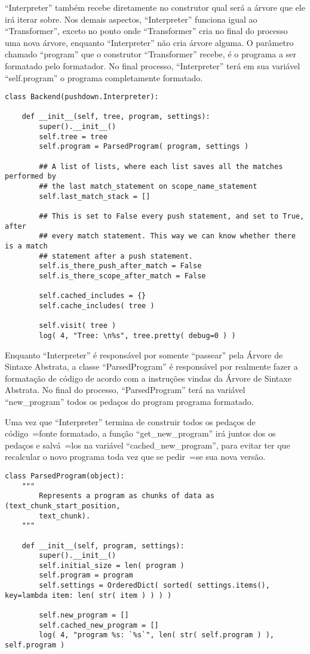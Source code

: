 ``Interpreter'' também recebe diretamente no construtor qual será a árvore que ele irá iterar sobre.
Nos demais aspectos,
``Interpreter'' funciona igual ao ``Transformer'',
exceto no ponto onde ``Transformer'' cria no final do processo uma nova árvore,
enquanto ``Interpreter'' não cria árvore alguma.
O parâmetro chamado ``program'' que o construtor ``Transformer'' recebe,
é o programa a ser formatado pelo formatador.
No final processo,
``Interpreter'' terá em sua variável ``self.program'' o programa completamente formatado.
\begin{lstlisting}[caption={Construtor do Formatador},label={construtorDoFormatador},style=mypython]
class Backend(pushdown.Interpreter):

    def __init__(self, tree, program, settings):
        super().__init__()
        self.tree = tree
        self.program = ParsedProgram( program, settings )

        ## A list of lists, where each list saves all the matches performed by
        ## the last match_statement on scope_name_statement
        self.last_match_stack = []

        ## This is set to False every push statement, and set to True, after
        ## every match statement. This way we can know whether there is a match
        ## statement after a push statement.
        self.is_there_push_after_match = False
        self.is_there_scope_after_match = False

        self.cached_includes = {}
        self.cache_includes( tree )

        self.visit( tree )
        log( 4, "Tree: \n%s", tree.pretty( debug=0 ) )
\end{lstlisting}

Enquanto ``Interpreter'' é responsável por somente ``passear'' pela Árvore de Sintaxe Abstrata,
a classe ``ParsedProgram''  é responsável por realmente fazer a formatação de código de acordo com a instruções vindas da Árvore de Sintaxe Abstrata.
No final do processo,
``ParsedProgram'' terá na variável ``new\_program'' todos os pedaços do program programa formatado.

Uma vez que ``Interpreter'' termina de construir todos os pedaços de código~=fonte formatado,
a função ``get\_new\_program'' irá juntos dos os pedaços e
salvá~=los na variável ``cached\_new\_program'',
para evitar ter que recalcular o novo programa toda vez que se pedir~=se sua nova versão.
\begin{lstlisting}[caption={Construtor de ParsedProgram},label={construtorDeParsedProgram},style=mypython]
class ParsedProgram(object):
    """
        Represents a program as chunks of data as (text_chunk_start_position,
        text_chunk).
    """

    def __init__(self, program, settings):
        super().__init__()
        self.initial_size = len( program )
        self.program = program
        self.settings = OrderedDict( sorted( settings.items(), key=lambda item: len( str( item ) ) ) )

        self.new_program = []
        self.cached_new_program = []
        log( 4, "program %s: `%s`", len( str( self.program ) ), self.program )
\end{lstlisting}

